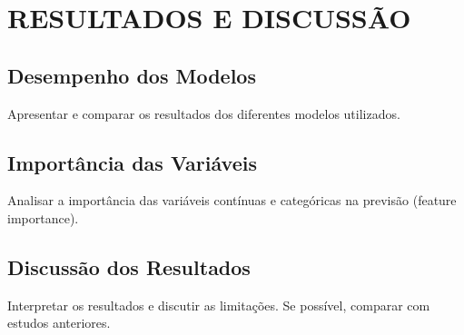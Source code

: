 \chapter{RESULTADOS E DISCUSS\~AO}
\section{Desempenho dos Modelos}
Apresentar e comparar os resultados dos diferentes modelos utilizados.

\section{Importância das Variáveis}
Analisar a importância das variáveis contínuas e categóricas na previsão (feature importance).

\section{Discuss\~ao dos Resultados}
Interpretar os resultados e discutir as limitações. Se possível, comparar com estudos anteriores.